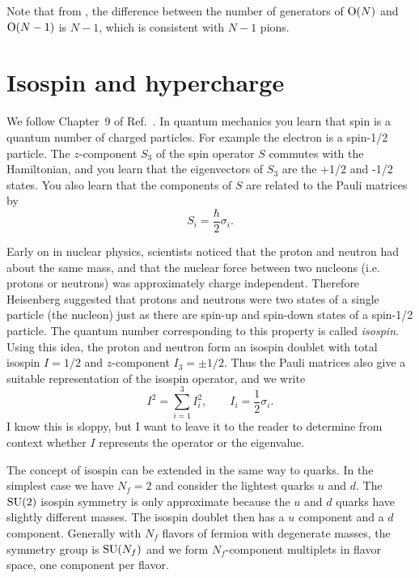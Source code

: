 Note that from , the difference between the number of generators
of $\operatorname{\text{O}}(N)$ and $\operatorname{\text{O}}(N-1)$ is $N-1$, which is consistent with $N-1$ pions.


\section{Isospin and hypercharge}\label{sec:isohyper}

We follow Chapter~9 of 
Ref.~\cite{thomson_modern_2013}. 
In quantum mechanics you learn that spin is a quantum number of
charged particles. For example the electron is a spin-1/2 particle. The
$z$-component $S_3$ of the spin operator $S$ commutes with the Hamiltonian, and
you learn that the eigenvectors of $S_3$ are the +1/2 and -1/2 states. You also
learn that the components of $S$ are related to the Pauli matrices by
\begin{equation}
  S_i=\frac{\hbar}{2}\sigma_i.
\end{equation}

Early on in nuclear physics, scientists noticed that the proton and neutron had
about the same mass, and that the nuclear force between two nucleons (i.e.
protons or neutrons) was approximately charge independent. Therefore Heisenberg
suggested that protons and neutrons were two states of a single particle (the
nucleon) just as there are spin-up and spin-down states of a spin-1/2
particle.
The quantum number corresponding to this property is called {\it isospin}.
Using this idea, the proton and neutron form an isospin doublet with total
isospin $I=1/2$ and $z$-component $I_3=\pm1/2$. Thus the Pauli matrices also
give a suitable representation of the isospin operator, and we write
\begin{equation}
  I^2=\sum\limits_{i=1}^3 I_i^2, \qquad I_i=\frac{1}{2}\sigma_i.
\end{equation}
I know this is sloppy, but I want to leave it to the reader to determine from
context whether $I$ represents the operator or the eigenvalue. 

The concept of isospin can be extended in the same way to quarks. 
In the simplest case we have $N_f=2$ and consider the lightest quarks
$u$ and $d$. The $\operatorname{SU}(2)$ isospin symmetry is only approximate because 
the $u$ and $d$ quarks have slightly different masses. The isospin 
doublet then has a $u$ component and a $d$ component. Generally with
$N_f$ flavors of fermion with degenerate masses, the symmetry group is 
$\operatorname{SU}(N_f)$ and we
form $N_f$-component multiplets in flavor space, one component per flavor.

